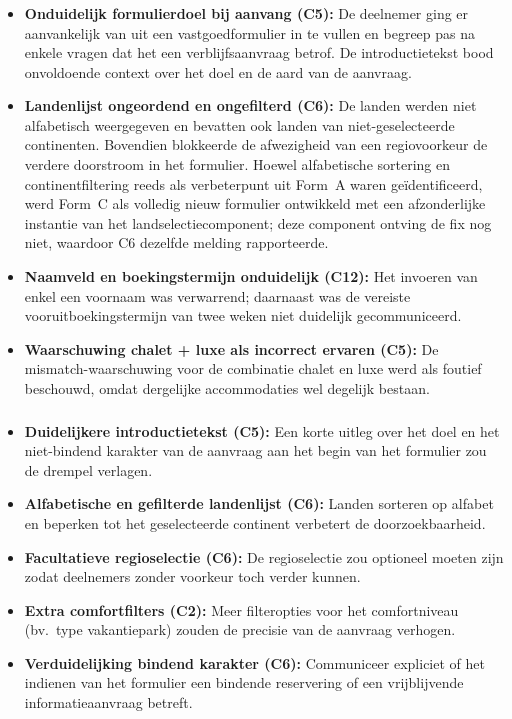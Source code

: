 \subsubsection{}

\begin{itemize}
  \item \textbf{Onduidelijk formulierdoel bij aanvang (C5):} De deelnemer ging er aanvankelijk van uit een vastgoedformulier in te vullen en begreep pas na enkele vragen dat het een verblijfsaanvraag betrof. De introductietekst bood onvoldoende context over het doel en de aard van de aanvraag.
  \item \textbf{Landenlijst ongeordend en ongefilterd (C6):} De landen werden niet alfabetisch weergegeven en bevatten ook landen van niet-geselecteerde continenten. Bovendien blokkeerde de afwezigheid van een regiovoorkeur de verdere doorstroom in het formulier. Hoewel alfabetische sortering en continentfiltering reeds als verbeterpunt uit Form~A waren geïdentificeerd, werd Form~C als volledig nieuw formulier ontwikkeld met een afzonderlijke instantie van het landselectiecomponent; deze component ontving de fix nog niet, waardoor C6 dezelfde melding rapporteerde.
  \item \textbf{Naamveld en boekingstermijn onduidelijk (C12):} Het invoeren van enkel een voornaam was verwarrend; daarnaast was de vereiste vooruitboekingstermijn van twee weken niet duidelijk gecommuniceerd.
  \item \textbf{Waarschuwing chalet + luxe als incorrect ervaren (C5):} De mismatch-waarschuwing voor de combinatie chalet en luxe werd als foutief beschouwd, omdat dergelijke accommodaties wel degelijk bestaan.
\end{itemize}

\subsubsection{}

\begin{itemize}
  \item \textbf{Duidelijkere introductietekst (C5):} Een korte uitleg over het doel en het niet-bindend karakter van de aanvraag aan het begin van het formulier zou de drempel verlagen.
  \item \textbf{Alfabetische en gefilterde landenlijst (C6):} Landen sorteren op alfabet en beperken tot het geselecteerde continent verbetert de doorzoekbaarheid.
  \item \textbf{Facultatieve regioselectie (C6):} De regioselectie zou optioneel moeten zijn zodat deelnemers zonder voorkeur toch verder kunnen.
  \item \textbf{Extra comfortfilters (C2):} Meer filteropties voor het comfortniveau (bv.\ type vakantiepark) zouden de precisie van de aanvraag verhogen.
  \item \textbf{Verduidelijking bindend karakter (C6):} Communiceer expliciet of het indienen van het formulier een bindende reservering of een vrijblijvende informatieaanvraag betreft.
\end{itemize}

